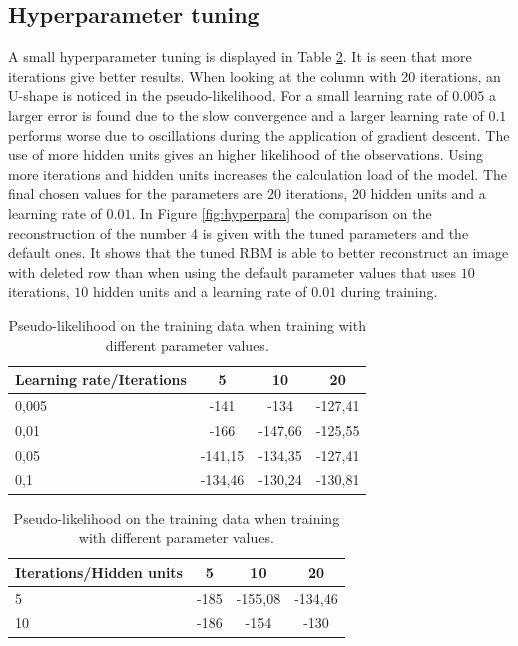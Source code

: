 \documentclass[a4paper,10pt]{article}
\begin{document}
\subsection{Hyperparameter tuning}
A small hyperparameter tuning is displayed in Table \ref{tab:pseudo-likelihood}. It is seen that more iterations give better results. When looking at the column with 20 iterations, an U-shape is noticed in the pseudo-likelihood. For a small learning rate of $ 0.005 $ a larger error is found due to the slow convergence and a larger learning rate of $ 0.1 $ performs worse due to oscillations during the application of gradient descent. The use of more hidden units gives an higher likelihood of the observations. Using more iterations and hidden units increases the calculation load of the model. The final chosen values for the parameters are $ 20 $ iterations, $ 20 $ hidden units and a learning rate of $ 0.01 $. In Figure \ref{fig:hyperpara} the comparison on the reconstruction of the number 4 is given with the tuned parameters and the default ones. It shows that the tuned RBM is able to better reconstruct an image with deleted row than when using the default parameter values that uses $ 10 $ iterations, $ 10 $ hidden units and a learning rate of $ 0.01 $ during training. 

\begin{table}[h]
	\begin{minipage}[t]{.55\linewidth}
		\centering
			\begin{tabular}[t]{@{}l|ccc}
				\firsthline
				\textbf{Learning rate}/\textbf{Iterations}	&  5 & 10 & 20 \\ \midrule
				0,005&	-141	&-134&	-127,41	\\ \hline
				0,01&	-166&	-147,66&	-125,55\\ \hline
				0,05 &	-141,15&	-134,35&	-127,41\\ \hline
				0,1 &	-134,46&	-130,24&	-130,81\\\bottomrule
			\end{tabular}		
	\end{minipage}
	\begin{minipage}[t]{.45\linewidth}
		\centering
		\begin{tabular}[t]{@{}l|ccc}
			\firsthline
			\textbf{Iterations}/\textbf{Hidden units}	&  5 & 10 & 20 \\ \midrule
			5 &-185	&-155,08&	-134,46	\\ \hline
			10&	-186	&-154&	-130\\\bottomrule
		\end{tabular}
	\end{minipage} 
	\caption{Pseudo-likelihood on the training data when training with different parameter values.}
	\label{tab:pseudo-likelihood}
\end{table}
\end{document}

